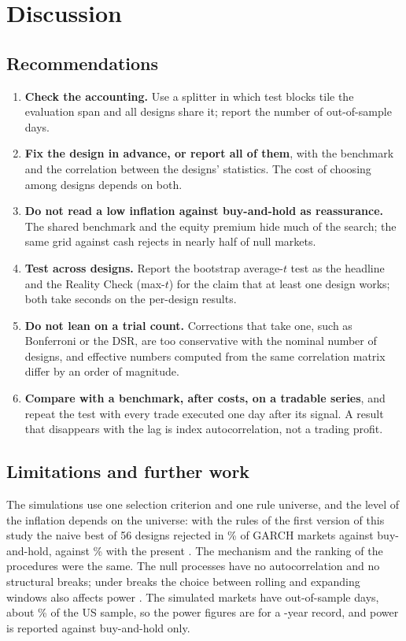 \documentclass[pdflatex,sn-basic]{sn-jnl}
\theoremstyle{thmstyleone}
\theoremstyle{thmstylethree}
\begin{document}
\section{Discussion}\label{sec:discussion}

\subsection{Recommendations}

\begin{enumerate}
\item \textbf{Check the accounting.} Use a splitter in which test blocks tile the evaluation span and all
designs share it; report the number of out-of-sample days.
\item \textbf{Fix the design in advance, or report all of them}, with the benchmark and the correlation
between the designs' statistics. The cost of choosing among designs depends on both.
\item \textbf{Do not read a low inflation against buy-and-hold as reassurance.} The shared benchmark
and the equity premium hide much of the search; the same grid against cash rejects in nearly half of
null markets.
\item \textbf{Test across designs.} Report the bootstrap average-$t$ test as the headline and the Reality
Check (max-$t$) for the claim that at least one design works; both take seconds on the per-design results.
\item \textbf{Do not lean on a trial count.} Corrections that take one, such as Bonferroni or the DSR,
are too conservative with the nominal number of designs, and effective numbers computed from the same
correlation matrix differ by an order of magnitude.
\item \textbf{Compare with a benchmark, after costs, on a tradable series}, and repeat the test with
every trade executed one day after its signal. A result that disappears with the lag is index
autocorrelation, not a trading profit.
\end{enumerate}

\subsection{Limitations and further work}\label{sec:limits}

The simulations use one selection criterion and one rule universe, and the level of the inflation
depends on the universe: with the \NumOldRules{} rules of the first version of this study the naive best
of 56 designs rejected in \NumOldSizeBestNaive\% of GARCH markets against buy-and-hold, against
\NumSizeBestNaive\% with the present \NumRules. The mechanism and the ranking of the procedures were the
same. The null processes have no autocorrelation and no structural breaks; under breaks the choice
between rolling and expanding windows also affects power \citep{pesaran2007,inoue2017}. The
simulated markets have \NumNoos{} out-of-sample days, about \NumNoosShareUS\% of the US sample, so the
power figures are for a \NumNoosYears-year record, and power is reported against buy-and-hold only.
\end{document}
